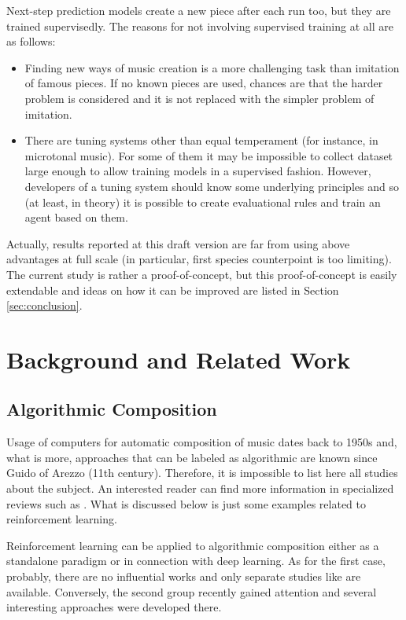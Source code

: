 \documentclass{article}
\begin{document}
Next-step prediction models create a new piece after each run too, but they are trained supervisedly. The reasons for not involving supervised training at all are as follows:
\begin{itemize}
	\item Finding new ways of music creation is a more challenging task than imitation of famous pieces. If no known pieces are used, chances are that the harder problem is considered and it is not replaced with the simpler problem of imitation.
	\item There are tuning systems other than equal temperament (for instance, in microtonal music). For some of them it may be impossible to collect dataset large enough to allow training models in a supervised fashion. However, developers of a tuning system should know some underlying principles and so (at least, in theory) it is possible to create evaluational rules and train an agent based on them.
\end{itemize}

Actually, results reported at this draft version are far from using above advantages at full scale (in particular, first species counterpoint is too limiting). The current study is rather a proof-of-concept, but this proof-of-concept is easily extendable and ideas on how it can be improved are listed in Section \ref{sec:conclusion}.


\section{Background and Related Work}
\label{sec:literature}

\subsection{Algorithmic Composition}
\label{subsec:composition}

Usage of computers for automatic composition of music dates back to 1950s and, what is more, approaches that can be labeled as algorithmic are known since Guido of Arezzo (11th century). Therefore, it is impossible to list here all studies about the subject. An interested reader can find more information in specialized reviews such as \cite{fernandez2013ai}. What is discussed below is just some examples related to reinforcement learning.

Reinforcement learning can be applied to algorithmic composition either as a standalone paradigm or in connection with deep learning. As for the first case, probably, there are no influential works and only separate studies like \cite{yi2007automatic} are available. Conversely, the second group recently gained attention and several interesting approaches were developed there.
\end{document}
